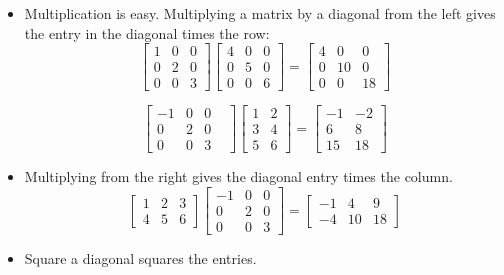 \begin{itemize}
	\item Multiplication is easy. Multiplying a matrix by a diagonal from the left gives the entry
		in the diagonal times the row:
		\[\begin{bmatrix} 1 & 0 & 0 \\ 0 & 2 & 0 \\ 0 & 0 & 3 \end{bmatrix}
		\begin{bmatrix} 4 & 0 & 0 \\ 0 & 5 & 0 \\ 0 & 0 & 6 \end{bmatrix} =
		\begin{bmatrix} 4 & 0 & 0 \\ 0 & 10 & 0 \\ 0 & 0 & 18 \end{bmatrix} \]

		\[ \begin{bmatrix} -1 & 0 & 0 & \\ 0 & 2 & 0 \\ 0 & 0 & 3 \end{bmatrix}
		\begin{bmatrix} 1 & 2 \\ 3 & 4 \\ 5 & 6 \end{bmatrix} =
		\begin{bmatrix} -1 & -2 \\ 6 & 8 \\15 & 18 \end{bmatrix} \]

	\item Multiplying from the right gives the diagonal entry times the column.
		\[\begin{bmatrix} 1 & 2 & 3 \\ 4 & 5 & 6 \end{bmatrix}
		\begin{bmatrix} -1 & 0 & 0 \\ 0 & 2 & 0 \\ 0 & 0 & 3 \end{bmatrix} =
		\begin{bmatrix}  -1 & 4 & 9 \\ -4 & 10 & 18 \end{bmatrix} \]
	\item Square a diagonal squares the entries.


\end{itemize}

